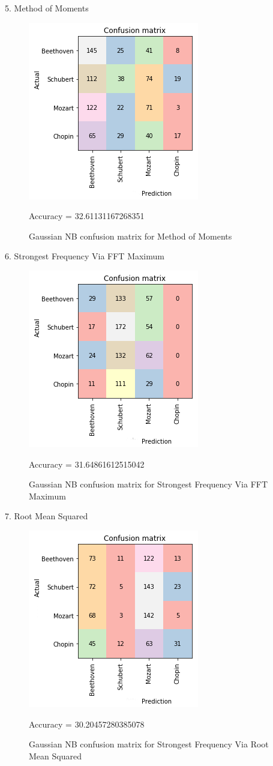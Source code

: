 \documentclass[11pt]{article}
\makeatletter
\def\maxwidth{\ifdim\Gin@nat@width>\linewidth\linewidth
    \else\Gin@nat@width\fi}
\let\Oldincludegraphics\includegraphics
\renewcommand{\includegraphics}[1]{\Oldincludegraphics[width=.8\maxwidth]{#1}}
\makeatother
\begin{document}
5. Method of Moments

\begin{figure}[h!]
\includegraphics{report/plots/Moments.png}\caption{Gaussian NB confusion matrix for Method of Moments}
Accuracy = 32.61131167268351
\end{figure}


6. Strongest Frequency Via FFT Maximum

\begin{figure}[h!]
\includegraphics{report/plots/FFTMax.png}
\caption{Gaussian NB confusion matrix for Strongest Frequency Via FFT Maximum}
Accuracy = 31.64861612515042
\end{figure}

7. Root Mean Squared

\begin{figure}[h!]
\includegraphics{report/plots/RMS.png} 
\caption{Gaussian NB confusion matrix for Strongest Frequency Via Root Mean Squared}
Accuracy = 30.20457280385078
\end{figure}
\end{document}
